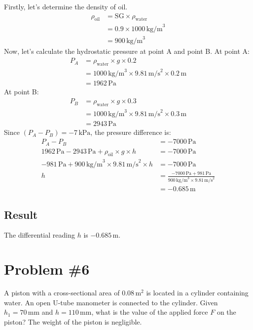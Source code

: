 \documentclass[12pt]{article}
\begin{document}
Firstly, let's determine the density of oil.
\begin{align*}
\rho_{\text{oil}} &= \text{SG} \times \rho_{\text{water}} \\
&= 0.9 \times 1000 \, \text{kg/m}^3 \\
&= 900 \, \text{kg/m}^3
\end{align*}
Now, let's calculate the hydrostatic pressure at point A and point B.
\newline
At point A:
\begin{align*}
P_A &= \rho_{\text{water}} \times g \times 0.2 \\
&= 1000 \, \text{kg/m}^3 \times 9.81 \, \text{m/s}^2 \times 0.2 \, \text{m} \\
&= 1962 \, \text{Pa}
\end{align*}
At point B:
\begin{align*}
P_B &= \rho_{\text{water}} \times g \times 0.3 \\
&= 1000 \, \text{kg/m}^3 \times 9.81 \, \text{m/s}^2 \times 0.3 \, \text{m} \\
&= 2943 \, \text{Pa}
\end{align*}
Since \( (P_A - P_B) = -7 \, \text{kPa} \), the pressure difference is:
\begin{align*}
P_A - P_B &= -7000 \, \text{Pa} \\
1962 \, \text{Pa} - 2943 \, \text{Pa} + \rho_{\text{oil}} \times g \times h &= -7000 \, \text{Pa} \\
-981 \, \text{Pa} + 900 \, \text{kg/m}^3 \times 9.81 \, \text{m/s}^2 \times h &= -7000 \, \text{Pa} \\
h &= \frac{-7000 \, \text{Pa} + 981 \, \text{Pa}}{900 \, \text{kg/m}^3 \times 9.81 \, \text{m/s}^2} \\
&= -0.685 \, \text{m}
\end{align*}

\subsection*{Result}
The differential reading \( h \) is \( -0.685 \, \text{m} \).
\newpage
\section*{Problem \#6}
A piston with a cross-sectional area of \(0.08 \, \text{m}^2\) is located in a cylinder containing water. An open U-tube manometer is connected to the cylinder. Given \(h_1 = 70 \, \text{mm}\) and \(h = 110 \, \text{mm}\), what is the value of the applied force \(F\) on the piston? The weight of the piston is negligible.
\end{document}
